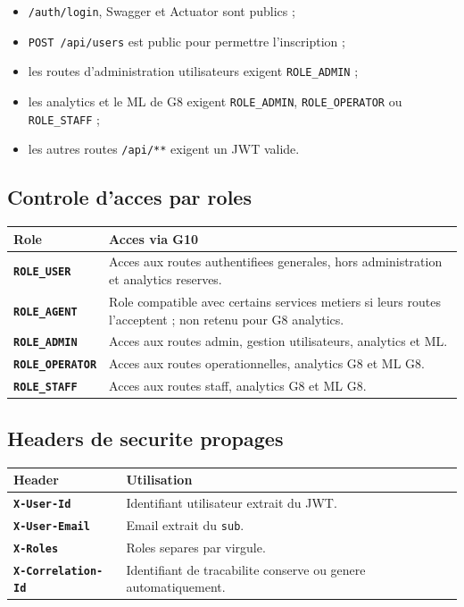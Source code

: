 \documentclass[12pt, a4paper]{article}
\begin{document}
\begin{itemize}
  \item \texttt{/auth/login}, Swagger et Actuator sont publics ;
  \item \texttt{POST /api/users} est public pour permettre l'inscription ;
  \item les routes d'administration utilisateurs exigent \texttt{ROLE\_ADMIN} ;
  \item les analytics et le ML de G8 exigent \texttt{ROLE\_ADMIN}, \texttt{ROLE\_OPERATOR} ou \texttt{ROLE\_STAFF} ;
  \item les autres routes \texttt{/api/**} exigent un JWT valide.
\end{itemize}

\subsection{Controle d'acces par roles}

\begin{center}
\begin{tabular}{>{\bfseries}p{3cm} p{8.8cm}}
\rowcolor{navyblue}
\color{white}\textbf{Role} & \color{white}\textbf{Acces via G10} \\
\hline
\texttt{ROLE\_USER} & Acces aux routes authentifiees generales, hors administration et analytics reserves. \\
\rowcolor{lightgray}
\texttt{ROLE\_AGENT} & Role compatible avec certains services metiers si leurs routes l'acceptent ; non retenu pour G8 analytics. \\
\texttt{ROLE\_ADMIN} & Acces aux routes admin, gestion utilisateurs, analytics et ML. \\
\rowcolor{lightgray}
\texttt{ROLE\_OPERATOR} & Acces aux routes operationnelles, analytics G8 et ML G8. \\
\texttt{ROLE\_STAFF} & Acces aux routes staff, analytics G8 et ML G8. \\
\end{tabular}
\end{center}

\subsection{Headers de securite propages}

\begin{center}
\begin{tabular}{>{\bfseries}p{4cm} p{8cm}}
\rowcolor{navyblue}
\color{white}\textbf{Header} & \color{white}\textbf{Utilisation} \\
\hline
\texttt{X-User-Id} & Identifiant utilisateur extrait du JWT. \\
\rowcolor{lightgray}
\texttt{X-User-Email} & Email extrait du \texttt{sub}. \\
\texttt{X-Roles} & Roles separes par virgule. \\
\rowcolor{lightgray}
\texttt{X-Correlation-Id} & Identifiant de tracabilite conserve ou genere automatiquement. \\
\end{tabular}
\end{center}
\end{document}
